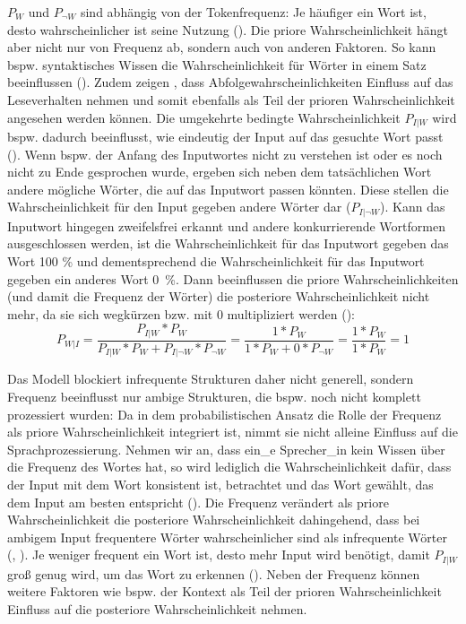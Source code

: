 $P_{W}$ und $P_{\neg W}$ sind abhängig von der Tokenfrequenz: Je häufiger ein Wort ist, desto wahrscheinlicher ist seine Nutzung (\cite[330]{Norris.2006}). Die priore Wahrscheinlichkeit hängt aber nicht nur von Frequenz ab, sondern auch von anderen Faktoren. So kann bspw. syntaktisches Wissen die Wahrscheinlichkeit für Wörter in einem Satz beeinflussen (\cite[331]{Norris.2006}). Zudem zeigen \textcite{McDonald.2003}, dass Abfolgewahrscheinlichkeiten Einfluss auf das Leseverhalten nehmen und somit ebenfalls als Teil der prioren Wahrscheinlichkeit angesehen werden können. Die umgekehrte bedingte Wahrscheinlichkeit $P_{I|W}$ wird bspw. dadurch beeinflusst, wie eindeutig der Input auf das gesuchte Wort passt (\cite[330]{Norris.2006}). Wenn bspw. der Anfang des Inputwortes nicht zu verstehen ist oder es noch nicht zu Ende gesprochen wurde, ergeben sich neben dem tatsächlichen Wort andere mögliche Wörter, die auf das Inputwort passen könnten. Diese stellen die Wahrscheinlichkeit für den Input gegeben andere Wörter dar ($P_{I|\neg W}$). Kann das Inputwort hingegen zweifelsfrei erkannt und andere konkurrierende Wortformen ausgeschlossen werden, ist die Wahrscheinlichkeit für das Inputwort gegeben das Wort 100 \% und dementsprechend die Wahrscheinlichkeit für das Inputwort gegeben ein anderes Wort 0~\%. Dann beeinflussen die priore Wahrscheinlichkeiten (und damit die Frequenz der Wörter) die posteriore Wahrscheinlichkeit nicht mehr, da sie sich wegkürzen bzw. mit 0 multipliziert werden (\cite[331]{Norris.2006}):
\[P_{W|I} = \frac{P_{I|W}*P_{W}}{P_{I|W}*P_{W} + P_{I|\neg W}*P_{\neg W}} = \frac{1*P_{W}}{1*P_{W} + 0*P_{\neg W}} = \frac{1*P_{W}}{1*P_{W}}= 1 \]

Das Modell blockiert infrequente Strukturen daher nicht generell, sondern Frequenz beeinflusst nur ambige Strukturen, die bspw. noch nicht komplett prozessiert wurden: Da in dem probabilistischen Ansatz die Rolle der Frequenz als priore Wahrscheinlichkeit integriert ist, nimmt  sie nicht alleine Einfluss auf die Sprachprozessierung. Nehmen wir an, dass ein\_e Sprecher\_in kein Wissen über die Frequenz des Wortes hat, so wird lediglich die Wahrscheinlichkeit dafür, dass der Input mit dem Wort konsistent ist, betrachtet und das Wort gewählt, das dem Input am besten entspricht (\cite[330]{Norris.2006}). Die Frequenz verändert als priore Wahrscheinlichkeit die posteriore Wahrscheinlichkeit dahingehend, dass bei ambigem Input frequentere Wörter wahrscheinlicher sind als infrequente Wörter (\cite[157]{Jurafsky.1996}, \cite[331]{Norris.2006}). Je weniger frequent ein Wort ist, desto mehr Input wird benötigt, damit $P_{I|W}$ groß genug wird, um das Wort zu erkennen (\cite[334]{Norris.2006}). Neben der Frequenz können weitere Faktoren wie bspw. der Kontext als Teil der prioren Wahrscheinlichkeit Einfluss auf die posteriore Wahrscheinlichkeit nehmen.

